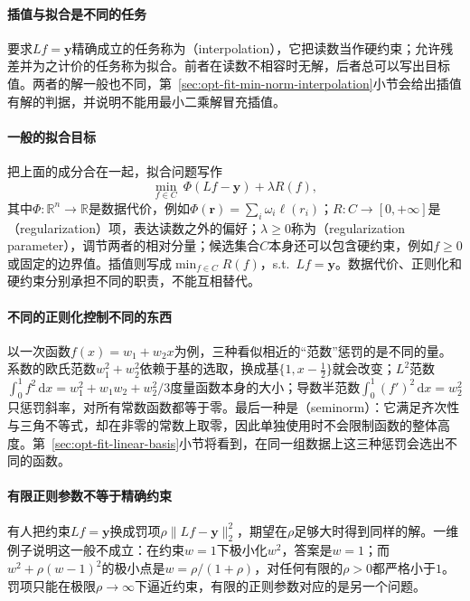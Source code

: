 \paragraph{插值与拟合是不同的任务}
要求$Lf=\bm y$精确成立的任务称为（interpolation），它把读数当作硬约束；允许残差并为之计价的任务称为拟合。前者在读数不相容时无解，后者总可以写出目标值。两者的解一般也不同，第~\ref{sec:opt-fit-min-norm-interpolation}小节会给出插值有解的判据，并说明不能用最小二乘解冒充插值。

\paragraph{一般的拟合目标}
把上面的成分合在一起，拟合问题写作
\begin{equation}
  \min_{f\in C}\ \Phi(Lf-\bm y)+\lambda R(f),
  \label{eq:opt-fit-general-objective}
\end{equation}
其中$\Phi:\mathbb R^n\to\mathbb R$是数据代价，例如$\Phi(\bm r)=\sum_i\omega_i\ell(r_i)$；$R:C\to[0,+\infty]$是（regularization）项，表达读数之外的偏好；$\lambda\ge0$称为（regularization parameter），调节两者的相对分量；候选集合$C$本身还可以包含硬约束，例如$f\ge0$或固定的边界值。插值则写成$\min_{f\in C}R(f)$，s.t.\ $Lf=\bm y$。数据代价、正则化和硬约束分别承担不同的职责，不能互相替代。

\paragraph{不同的正则化控制不同的东西}
以一次函数$f(x)=w_1+w_2x$为例，三种看似相近的“范数”惩罚的是不同的量。系数的欧氏范数$w_1^2+w_2^2$依赖于基的选取，换成基$\{1,x-\tfrac12\}$就会改变；$L^2$范数$\int_0^1f^2\,\mathrm dx=w_1^2+w_1w_2+w_2^2/3$度量函数本身的大小；导数半范数$\int_0^1(f')^2\,\mathrm dx=w_2^2$只惩罚斜率，对所有常数函数都等于零。最后一种是（seminorm）：它满足齐次性与三角不等式，却在非零的常数上取零，因此单独使用时不会限制函数的整体高度。第~\ref{sec:opt-fit-linear-basis}小节将看到，在同一组数据上这三种惩罚会选出不同的函数。

\paragraph{有限正则参数不等于精确约束}
有人把约束$Lf=\bm y$换成罚项$\rho\|Lf-\bm y\|_2^2$，期望在$\rho$足够大时得到同样的解。一维例子说明这一般不成立：在约束$w=1$下极小化$w^2$，答案是$w=1$；而$w^2+\rho(w-1)^2$的极小点是$w=\rho/(1+\rho)$，对任何有限的$\rho>0$都严格小于$1$。罚项只能在极限$\rho\to\infty$下逼近约束，有限的正则参数对应的是另一个问题。

